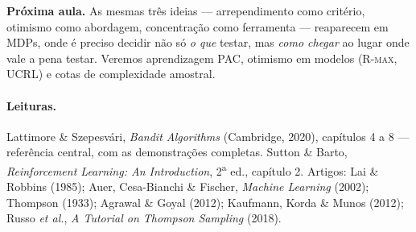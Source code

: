 \documentclass[11pt, a4paper]{article}
\begin{document}
\begin{ideiabox}
\textbf{Próxima aula.} As mesmas três ideias — arrependimento como critério,
otimismo como abordagem, concentração como ferramenta — reaparecem em MDPs,
onde é preciso decidir não só \emph{o que} testar, mas \emph{como chegar} ao
lugar onde vale a pena testar. Veremos aprendizagem PAC, otimismo em modelos
(\textsc{R-max}, UCRL) e cotas de complexidade amostral.
\end{ideiabox}

\paragraph{Leituras.} Lattimore \& Szepesvári, \emph{Bandit Algorithms}
(Cambridge, 2020), capítulos 4 a 8 — referência central, com as
demonstrações completas. Sutton \& Barto, \emph{Reinforcement Learning: An
Introduction}, 2\textsuperscript{a} ed., capítulo 2. Artigos: Lai \& Robbins
(1985); Auer, Cesa-Bianchi \& Fischer, \emph{Machine Learning} (2002);
Thompson (1933); Agrawal \& Goyal (2012); Kaufmann, Korda \& Munos (2012);
Russo \emph{et al.}, \emph{A Tutorial on Thompson Sampling} (2018).
\end{document}
